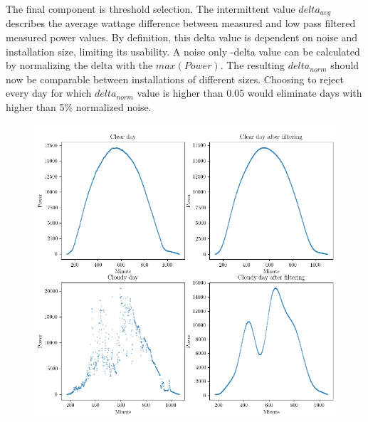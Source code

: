 \noindent The final component is threshold selection. The intermittent value $delta_{avg}$ describes the average wattage difference between measured and low pass filtered measured power values. By definition, this delta value is dependent on noise and installation size, limiting its usability. A noise only -delta value can be calculated by normalizing the delta with the $max(Power)$. The resulting $delta_{norm}$ should now be comparable between installations of different sizes. Choosing to reject every day for which $delta_{norm}$ value is higher than 0.05 would eliminate days with higher than 5\% normalized noise.




\begin{figure}[h]
\centering
\includegraphics[width=0.8\linewidth]{pics/cloudfree_algo}
\label{fig_cloudfree_algo}
\end{figure}



\newpage










